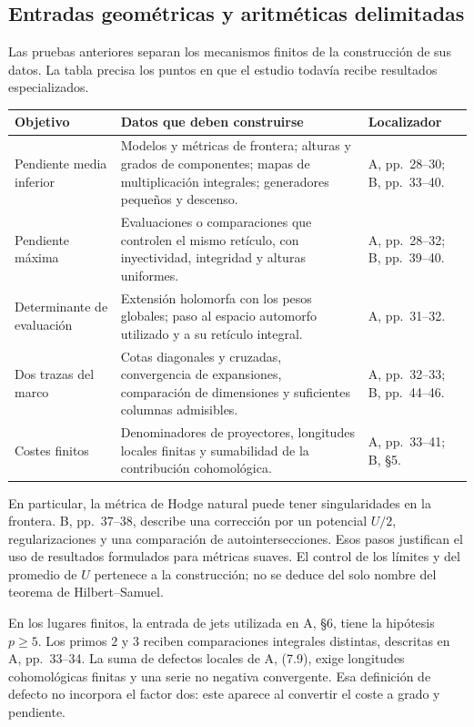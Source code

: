 \subsection{Entradas geométricas y aritméticas delimitadas}

Las pruebas anteriores separan los mecanismos finitos de la
construcción de sus datos. La tabla precisa los puntos en que
el estudio todavía recibe resultados especializados.

\begin{center}
\small
\begin{tabularx}{\textwidth}{@{}>{\raggedright\arraybackslash}p{}Y>{\raggedright\arraybackslash}p{0.18\textwidth}@{}}
\toprule
Objetivo & Datos que deben construirse & Localizador\\
\midrule
Pendiente media inferior &
Modelos y métricas de frontera; alturas y grados de componentes;
mapas de multiplicación integrales; generadores pequeños y descenso. &
A, pp.~28--30; B, pp.~33--40.\\
Pendiente máxima &
Evaluaciones o comparaciones que controlen el mismo retículo,
con inyectividad, integridad y alturas uniformes. &
A, pp.~28--32; B, pp.~39--40.\\
Determinante de evaluación &
Extensión holomorfa con los pesos globales; paso al espacio
automorfo utilizado y a su retículo integral. &
A, pp.~31--32.\\
Dos trazas del marco &
Cotas diagonales y cruzadas, convergencia de expansiones,
comparación de dimensiones y suficientes columnas admisibles. &
A, pp.~32--33; B, pp.~44--46.\\
Costes finitos &
Denominadores de proyectores, longitudes locales finitas
y sumabilidad de la contribución cohomológica. &
A, pp.~33--41; B, §5.\\
\bottomrule
\end{tabularx}
\end{center}

En particular, la métrica de Hodge natural puede tener
singularidades en la frontera. B, pp.~37--38, describe una
corrección por un potencial $U/2$, regularizaciones y una
comparación de autointersecciones. Esos pasos justifican
el uso de resultados formulados para métricas suaves.
El control de los límites y del promedio de $U$ pertenece
a la construcción; no se deduce del solo nombre del
teorema de Hilbert--Samuel.

En los lugares finitos, la entrada de jets utilizada en A, §6,
tiene la hipótesis $p\ge5$. Los primos $2$ y $3$ reciben
comparaciones integrales distintas, descritas en A, pp.~33--34.
La suma de defectos locales de A, (7.9), exige longitudes
cohomológicas finitas y una serie no negativa convergente.
Esa definición de defecto no incorpora el factor dos:
este aparece al convertir el coste a grado y pendiente.

